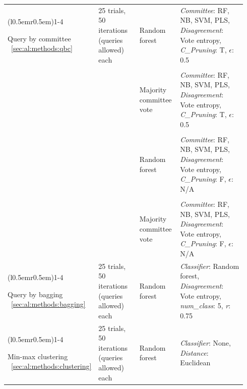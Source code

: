 \begin{longtable}{p{0.15\linewidth} p{0.21\linewidth} p{0.18\linewidth} 
p{0.4\linewidth}}
	\cmidrule[0.1pt](l{0.5em}r{0.5em}){1-4}
	
	Query by \newline committee ~\ref{sec:al:methods:qbc} & 
	25 trials, 50 iterations (queries allowed) each & 
	Random forest &	
	\textit{Committee}: RF, NB, SVM, PLS, \newline 
	\textit{Disagreement}: Vote entropy, \newline 
	\textit{C\_Pruning}: T, $\epsilon$: 0.5 \\ & \\
	
	& & Majority \newline committee \newline vote &	
	\textit{Committee}: RF, NB, SVM, PLS, \newline 
	\textit{Disagreement}: Vote entropy, \newline 
	\textit{C\_Pruning}: T, $\epsilon$: 0.5 \\ & \\
	
	& & Random forest &	
	\textit{Committee}: RF, NB, SVM, PLS, \newline 
	\textit{Disagreement}: Vote entropy, \newline 
	\textit{C\_Pruning}: F, $\epsilon$: N/A \\ & \\
	
	& & Majority \newline committee \newline vote &	
	\textit{Committee}: RF, NB, SVM, PLS, \newline 
	\textit{Disagreement}: Vote entropy, \newline 
	\textit{C\_Pruning}: F, $\epsilon$: N/A \\	
	
	\cmidrule[0.1pt](l{0.5em}r{0.5em}){1-4}	
	
	Query by \newline bagging ~\ref{sec:al:methods:bagging} & 
	25 trials, 50 iterations (queries allowed) each & 
	Random forest &
	\textit{Classifier}: Random forest, \newline \textit{Disagreement}: Vote 
	entropy, \newline \textit{num\_class}: 5, \textit{r}: 0.75 \\
		
	\cmidrule[0.1pt](l{0.5em}r{0.5em}){1-4}	
	
	Min-max \newline clustering ~\ref{sec:al:methods:clustering} & 
	25 trials, 50 iterations (queries allowed) each & 
	Random forest & 
	\textit{Classifier}: None, \newline \textit{Distance}: Euclidean \\
	
\end{longtable}
\bodyspacing

